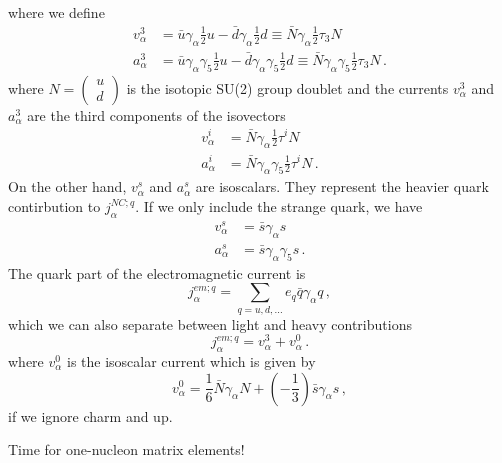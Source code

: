   where we define
  \begin{align*}
      v_{\alpha}^3 &= \bar{u}\gamma_{\alpha}\frac{1}{2}u - \bar{d}\gamma_{\alpha}\frac{1}{2}d \equiv \bar{N} \gamma_{\alpha}\frac{1}{2}\tau_3 N \\
      a_{\alpha}^3 &= \bar{u}\gamma_{\alpha}\gamma_5\frac{1}{2}u - \bar{d}\gamma_{\alpha}\gamma_5\frac{1}{2}d \equiv \bar{N} \gamma_{\alpha}\gamma_5\frac{1}{2}\tau_3 N \,.
  \end{align*}
  where $N = \left(\begin{matrix}{u}\\{d}\end{matrix} \right)$ is the isotopic
  SU(2) group doublet and the currents $v_{\alpha}^3$ and $a_{\alpha}^3$
  are the third components of the isovectors
  \begin{align*}
      v_{\alpha}^i &= \bar{N} \gamma_{\alpha}\frac{1}{2}\tau^i N \\
      a_{\alpha}^i &= \bar{N} \gamma_{\alpha}\gamma_5\frac{1}{2}\tau^i N \,.
  \end{align*}
  On the other hand, $v_{\alpha}^s$ and $a_{\alpha}^s$ are isoscalars. They
  represent the heavier quark contirbution to $j_{\alpha}^{NC;q}$. If we only
  include the strange quark, we have
  \begin{align*}
      v_{\alpha}^s &= \bar{s}\gamma_{\alpha}s \\
      a_{\alpha}^s &= \bar{s}\gamma_{\alpha}\gamma_5 s \,.
  \end{align*}
  The quark part of the electromagnetic current is
  \[
    j_{\alpha}^{em;q} = \sum_{q=u,d,...} e_q\bar{q} \gamma_{\alpha}q \,,
  \]
  which we can also separate between light and heavy contributions
  \[
    j_{\alpha}^{em;q} = v_{\alpha}^3 + v_{\alpha}^0 \,.
  \]
  where $v_{\alpha}^0$ is the isoscalar current which is given by
  \[
    v_{\alpha}^0 = \frac{1}{6}\bar{N}\gamma_{\alpha}N + \left(-\frac{1}{3}\right)\bar{s}\gamma_{\alpha}s \,,
  \]
  if we ignore charm and up.

  Time for one-nucleon matrix elements! 


